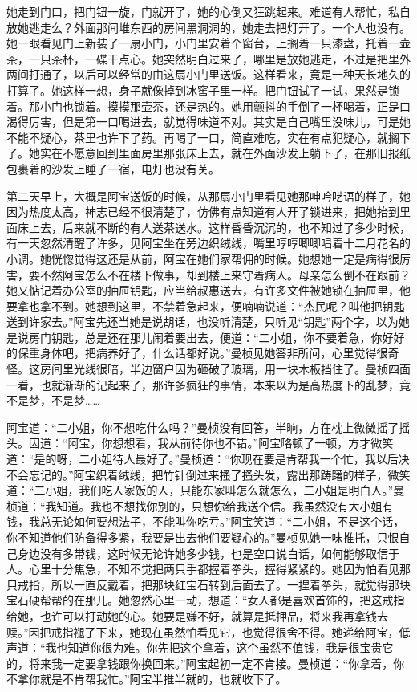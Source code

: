 \par 她走到门口，把门钮一旋，门就开了，她的心倒又狂跳起来。难道有人帮忙，私自放她逃走么？外面那间堆东西的房间黑洞洞的，她走去把灯开了。一个人也没有。她一眼看见门上新装了一扇小门，小门里安着个窗台，上搁着一只漆盘，托着一壶茶，一只茶杯，一碟干点心。她突然明白过来了，哪里是放她逃走，不过是把里外两间打通了，以后可以经常的由这扇小门里送饭。这样看来，竟是一种天长地久的打算了。她这样一想，身子就像掉到冰窖子里一样。把门钮试了一试，果然是锁着。那小门也锁着。摸摸那壶茶，还是热的。她用颤抖的手倒了一杯喝着，正是口渴得厉害，但是第一口喝进去，就觉得味道不对。其实是自己嘴里没味儿，可是她不能不疑心，茶里也许下了药。再喝了一口，简直难吃，实在有点犯疑心，就搁下了。她实在不愿意回到里面房里那张床上去，就在外面沙发上躺下了，在那旧报纸包裹着的沙发上睡了一宿，电灯也没有关。
\par 第二天早上，大概是阿宝送饭的时候，从那扇小门里看见她那呻吟呓语的样子，她因为热度太高，神志已经不很清楚了，仿佛有点知道有人开了锁进来，把她抬到里面床上去，后来就不断的有人送茶送水。这样昏昏沉沉的，也不知过了多少时候，有一天忽然清醒了许多，见阿宝坐在旁边织绒线，嘴里哼哼唧唧唱着十二月花名的小调。她恍惚觉得这还是从前，阿宝在她们家帮佣的时候。她想她一定是病得很厉害，要不然阿宝怎么不在楼下做事，却到楼上来守着病人。母亲怎么倒不在跟前？她又惦记着办公室的抽屉钥匙，应当给叔惠送去，有许多文件被她锁在抽屉里，他要拿也拿不到。她想到这里，不禁着急起来，便喃喃说道：“杰民呢？叫他把钥匙送到许家去。”阿宝先还当她是说胡话，也没听清楚，只听见“钥匙”两个字，以为她是说房门钥匙，总是还在那儿闹着要出去，便道：“二小姐，你不要着急，你好好的保重身体吧，把病养好了，什么话都好说。”曼桢见她答非所问，心里觉得很奇怪。这房间里光线很暗，半边窗户因为砸破了玻璃，用一块木板挡住了。曼桢四面一看，也就渐渐的记起来了，那许多疯狂的事情，本来以为是高热度下的乱梦，竟不是梦，不是梦……
\par 阿宝道：“二小姐，你不想吃什么吗？”曼桢没有回答，半晌，方在枕上微微摇了摇头。因道：“阿宝，你想想看，我从前待你也不错。”阿宝略顿了一顿，方才微笑道：“是的呀，二小姐待人最好了。”曼桢道：“你现在要是肯帮我一个忙，我以后决不会忘记的。”阿宝织着绒线，把竹针倒过来搔了搔头发，露出那踌躇的样子，微笑道：“二小姐，我们吃人家饭的人，只能东家叫怎么就怎么，二小姐是明白人。”曼桢道：“我知道。我也不想找你别的，只想你给我送个信。我虽然没有大小姐有钱，我总无论如何要想法子，不能叫你吃亏。”阿宝笑道：“二小姐，不是这个话，你不知道他们防备得多紧，我要是出去他们要疑心的。”曼桢见她一味推托，只恨自己身边没有多带钱，这时候无论许她多少钱，也是空口说白话，如何能够取信于人。心里十分焦急，不知不觉把两只手都握着拳头，握得紧紧的。她因为怕看见那只戒指，所以一直反戴着，把那块红宝石转到后面去了。一捏着拳头，就觉得那块宝石硬帮帮的在那儿。她忽然心里一动，想道：“女人都是喜欢首饰的，把这戒指给她，也许可以打动她的心。她要是嫌不好，就算是抵押品，将来我再拿钱去赎。”因把戒指褪了下来，她现在虽然怕看见它，也觉得很舍不得。她递给阿宝，低声道：“我也知道你很为难。你先把这个拿着，这个虽然不值钱，我是很宝贵它的，将来我一定要拿钱跟你换回来。”阿宝起初一定不肯接。曼桢道：“你拿着，你不拿你就是不肯帮我忙。”阿宝半推半就的，也就收下了。
